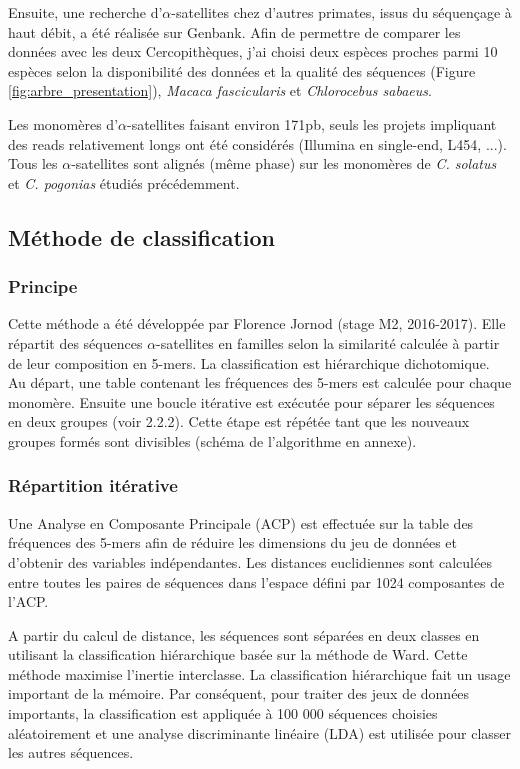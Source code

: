 \documentclass[12pt,a4paper]{article}
\begin{document}
Ensuite, une recherche d'$\alpha$-satellites chez d'autres primates, issus du séquençage à haut débit, a été réalisée sur Genbank. Afin de permettre de comparer les données avec les deux Cercopithèques, j'ai choisi deux espèces proches parmi 10 espèces selon la disponibilité des données et la qualité des séquences (Figure \ref{fig:arbre_presentation}), \textit{Macaca fascicularis} et \textit{Chlorocebus sabaeus}.

Les monomères d'$\alpha$-satellites faisant environ 171pb,  seuls les projets impliquant des reads relativement longs ont été considérés (Illumina en single-end, L454, ...). Tous les $\alpha$-satellites sont alignés (même phase) sur les monomères de \textit{C. solatus} et \textit{C. pogonias} étudiés précédemment.


\subsection{Méthode de classification}
	\subsubsection{Principe}
Cette méthode a été développée par Florence Jornod (stage M2, 2016-2017). Elle répartit des séquences $\alpha$-satellites en familles selon la similarité calculée à partir de leur composition en 5-mers. La classification est hiérarchique dichotomique. Au départ, une table contenant les fréquences des 5-mers est calculée pour chaque monomère. Ensuite une boucle itérative est exécutée pour séparer les séquences en deux groupes (voir 2.2.2). Cette étape est répétée tant que les nouveaux groupes formés sont divisibles (schéma de l'algorithme en annexe).

	\subsubsection{Répartition itérative}
Une Analyse en Composante Principale (ACP) est effectuée sur la table des fréquences des 5-mers afin de réduire les dimensions du jeu de données et d’obtenir des variables indépendantes. Les distances euclidiennes sont calculées entre toutes les paires de séquences dans l’espace défini par 1024 composantes de l’ACP. 

A partir du calcul de distance, les séquences sont séparées en deux classes en utilisant la classification hiérarchique basée sur la méthode de Ward. Cette méthode maximise l’inertie interclasse. La classification hiérarchique fait un usage important de la mémoire. Par conséquent, pour traiter des jeux de données importants, la classification est appliquée à 100 000 séquences choisies aléatoirement et une analyse discriminante linéaire (LDA) est utilisée pour classer les autres séquences.
\end{document}
